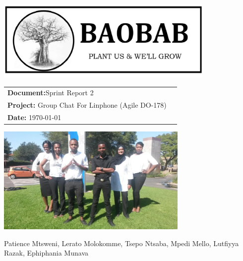 \begin{titlepage}

\begin{center}

\includegraphics[width=400px]{pictures/logo.jpg}
\vspace{0.5 cm}
\begin{flushright} \large
\begin{tabular}{lr}
\vspace{1 cm}
\LARGE\textbf{Document:}Sprint Report 2\\

\vspace{1 cm}
\LARGE\textbf{Project:} Group Chat For Linphone (Agile DO-178)\\
\LARGE\textbf{Date: }\today\\
\end{tabular}
\end{flushright}

\centering \includegraphics[width=350px]{pictures/Team.jpg}

Patience Mtsweni, Lerato Molokomme, Tsepo Ntsaba, Mpedi Mello, Lutfiyya Razak, Ephiphania Munava\\


\end{center}
\end{titlepage}